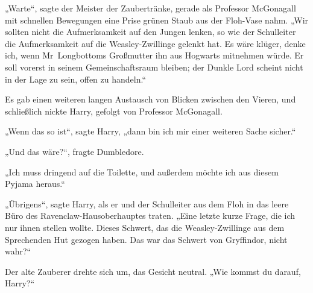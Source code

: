 „Warte“, sagte der Meister der Zaubertränke, gerade als Professor McGonagall mit schnellen Bewegungen eine Prise grünen Staub aus der Floh-Vase nahm.
„Wir sollten nicht die Aufmerksamkeit auf den Jungen lenken, so wie der Schulleiter die Aufmerksamkeit auf die Weasley-Zwillinge gelenkt hat. Es wäre klüger, denke ich, wenn Mr~Longbottoms Großmutter ihn aus Hogwarts mitnehmen würde. Er soll vorerst in seinem Gemeinschaftsraum bleiben; der Dunkle Lord scheint nicht in der Lage zu sein, offen zu handeln.“

Es gab einen weiteren langen Austausch von Blicken zwischen den Vieren, und schließlich nickte Harry, gefolgt von Professor McGonagall.

„Wenn das so ist“, sagte Harry, „dann bin ich mir einer weiteren Sache sicher.“

„Und das wäre?“, fragte Dumbledore.

„Ich muss dringend auf die Toilette, und außerdem möchte ich aus diesem Pyjama heraus.“

\later

„Übrigens“, sagte Harry, als er und der Schulleiter aus dem Floh in das leere Büro des Ravenclaw-Hausoberhauptes traten.
„Eine letzte kurze Frage, die ich nur ihnen stellen wollte. Dieses Schwert, das die Weasley-Zwillinge aus dem Sprechenden Hut gezogen haben. Das war das Schwert von Gryffindor, nicht wahr?“

Der alte Zauberer drehte sich um, das Gesicht neutral.
„Wie kommst du darauf, Harry?“

